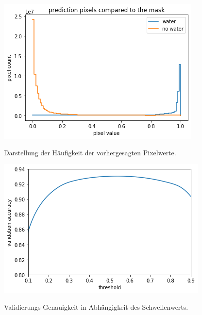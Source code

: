 \begin{figure}[ht]
    \centering
    \begin{minipage}[t]{0.464\linewidth}
        \centering
        \includegraphics[width=\textwidth]{content/img/pixel_values_counter.png}
        \caption{ }{Darstellung der Häufigkeit der vorhergesagten Pixelwerte.}
        \label{fig:count_values}
    \end{minipage}%
    \begin{minipage}[t]{0.48\linewidth}
        \centering
        \includegraphics[width=\textwidth]{content/img/schwellenwert.png}
        \caption{ }{Validierungs Genauigkeit in Abhängigkeit des Schwellenwerts.}
        \label{fig:schwellenwert}
    \end{minipage}
\end{figure}

